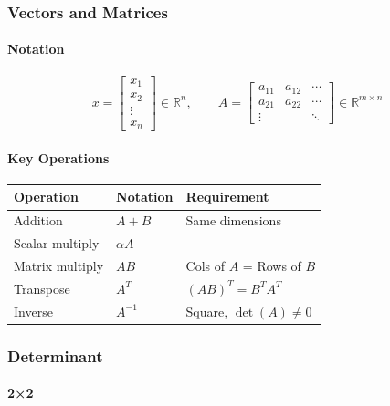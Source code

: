 \documentclass[11pt,a4paper]{book}
\begin{document}
\medskip\noindent\hrulefill\medskip

\subsubsection{Vectors and Matrices}

\paragraph{Notation}

\[x = \begin{bmatrix} x_1 \\ x_2 \\ \vdots \\ x_n \end{bmatrix} \in \mathbb{R}^n, \qquad A = \begin{bmatrix} a_{11} & a_{12} & \cdots \\ a_{21} & a_{22} & \cdots \\ \vdots & & \ddots \end{bmatrix} \in \mathbb{R}^{m \times n}\]

\paragraph{Key Operations}

\begin{center}
\begin{tabular}{|l|l|l|}
\hline
Operation & Notation & Requirement \\
\hline
Addition & $A + B$ & Same dimensions \\
Scalar multiply & $\alpha A$ & — \\
Matrix multiply & $AB$ & Cols of $A$ = Rows of $B$ \\
Transpose & $A^T$ & $(AB)^T = B^T A^T$ \\
Inverse & $A^{-1}$ & Square, $\det(A) \neq 0$ \\
\hline
\end{tabular}
\end{center}

\medskip\noindent\hrulefill\medskip

\subsubsection{Determinant}

\paragraph{2×2}
\end{document}
